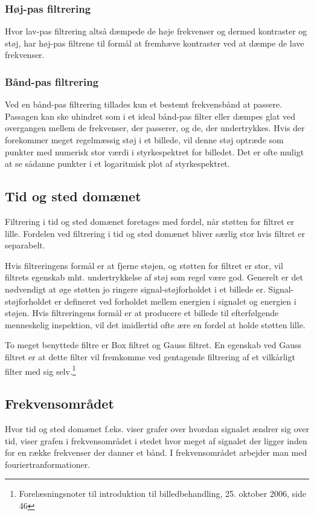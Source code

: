 \subsubsection{Høj-pas filtrering}
Hvor lav-pas filtrering altså dæmpede de høje frekvenser og dermed kontraster og støj, har høj-pas filtrene til formål at fremhæve kontraster ved at dæmpe de lave frekvenser. 

\subsubsection{Bånd-pas filtrering}
Ved en bånd-pas filtrering tillades kun et bestemt frekvensbånd at passere. Passagen kan ske uhindret som i et ideal bånd-pas filter eller dæmpes glat ved overgangen mellem de frekvenser, der passerer, og de, der undertrykkes. Hvis der forekommer meget regelmæssig støj i et billede, vil denne støj optræde som punkter med numerisk stor værdi i styrkespektret for billedet. Det er ofte muligt at se sådanne punkter i et logaritmisk plot af styrkespektret.

\subsection{Tid og sted domænet}
Filtrering i tid og sted domænet foretages med fordel, når støtten for filtret er lille. Fordelen ved filtrering i tid og sted domænet bliver særlig stor hvis filtret er separabelt. 

Hvis filtreringens formål er at fjerne støjen, og støtten for filtret er stor, vil filtrets egenskab mht. undertrykkelse af støj som regel være god. Generelt er det nødvendigt at øge støtten jo ringere signal-støjforholdet i et billede er. Signal-støjforholdet er defineret ved forholdet mellem energien i signalet og energien i støjen. Hvis filtreringens formål er at producere et billede til efterfølgende menneskelig inspektion, vil det imidlertid ofte ære en fordel at holde støtten lille.

To meget benyttede filtre er Box filtret og Gauss filtret. En egenskab ved Gauss filtret er at dette filter vil fremkomme ved gentagende filtrering af et vilkårligt filter med sig selv.\footnote{Forelæsningsnoter til introduktion til billedbehandling, 25. oktober 2006, side 46}

\subsection{Frekvensområdet}
Hvor tid og sted domænet f.eks. viser grafer over hvordan signalet ændrer sig over tid, viser grafen i frekvensområdet i stedet hvor meget af signalet der ligger inden for en række frekvenser der danner et bånd. I frekvensområdet arbejder man med fouriertranformationer.

